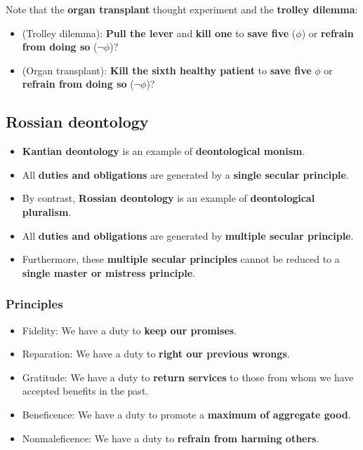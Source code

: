 \documentclass[11pt]{article}
\begin{document}
Note that the \textbf{organ transplant} thought experiment and the \textbf{trolley dilemma}:
\begin{itemize}
\item (Trolley dilemma): \textbf{Pull the lever} and \textbf{kill one} to \textbf{save five} (\(\phi\)) or \textbf{refrain from doing so} (\(\neg \phi\))?
\item (Organ transplant): \textbf{Kill the sixth healthy patient} to \textbf{save five} \(\phi\) or \textbf{refrain from doing so} (\(\neg \phi\))?
\end{itemize}
\subsection{Rossian deontology}
\label{sec:org87ee88a}
\begin{itemize}
\item \textbf{Kantian deontology} is an example of \textbf{deontological monism}.
\item All \textbf{duties and obligations} are generated by a \textbf{single secular principle}.
\item By contrast, \textbf{Rossian deontology} is an example of \textbf{deontological pluralism}.
\item All \textbf{duties and obligations} are generated by \textbf{multiple secular principle}.
\item Furthermore, these \textbf{multiple secular principles} cannot be reduced to a \textbf{single master or mistress principle}.
\end{itemize}
\subsubsection{Principles}
\label{sec:orge42c201}
\begin{itemize}
\item Fidelity:
We have a duty to \textbf{keep our promises}.
\item Reparation:
We have a duty to \textbf{right our previous wrongs}.
\item Gratitude:
We have a duty to \textbf{return services} to those from whom we have accepted benefits in the past.
\item Beneficence:
We have a duty to promote a \textbf{maximum of aggregate good}.
\item Nonmaleficence:
We have a duty to \textbf{refrain from harming others}.
\end{itemize}

 \newpage
\end{document}
